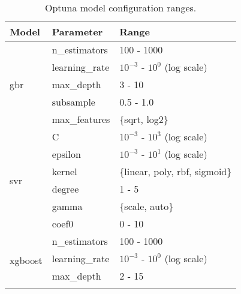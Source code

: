 \begin{table*}
\centering
\caption{Optuna model configuration ranges.}
\begin{tabular}{@{}l>{\ttfamily}lp{}@{}}
\toprule
\textbf{Model}                 & \textbf{Parameter}          & \textbf{Range}                           \\ \midrule
\multirow{5}{*}{\gls{gbr}}     & n\_estimators               & 100 - 1000                                \\ \cmidrule{2-3}
                               & learning\_rate              & $10^{-3}$ - $10^{0}$ (log scale)          \\ \cmidrule{2-3}
                               & max\_depth                  & 3 - 10                                    \\ \cmidrule{2-3}
                               & subsample                   & 0.5 - 1.0                                 \\ \cmidrule{2-3}
                               & max\_features               & \{sqrt, log2\}                            \\ \midrule
\multirow{6}{*}{\gls{svr}}     & C                           & $10^{-3}$ - $10^{3}$ (log scale)          \\ \cmidrule{2-3}
                               & epsilon                     & $10^{-3}$ - $10^{1}$ (log scale)          \\ \cmidrule{2-3}
                               & kernel                      & \{linear, poly, rbf, sigmoid\}            \\ \cmidrule{2-3}
                               & degree                      & 1 - 5                                     \\ \cmidrule{2-3}
                               & gamma                       & \{scale, auto\}                           \\ \cmidrule{2-3}
                               & coef0                       & 0 - 10                                    \\ \midrule
\multirow{8}{*}{\gls{xgboost}} & n\_estimators               & 100 - 1000                                \\ \cmidrule{2-3}
                               & learning\_rate              & $10^{-3}$ - $10^{0}$ (log scale)          \\ \cmidrule{2-3}
                               & max\_depth                  & 2 - 15                                    \\ \cmidrule{2-3}

\end{tabular}
\end{table*}
